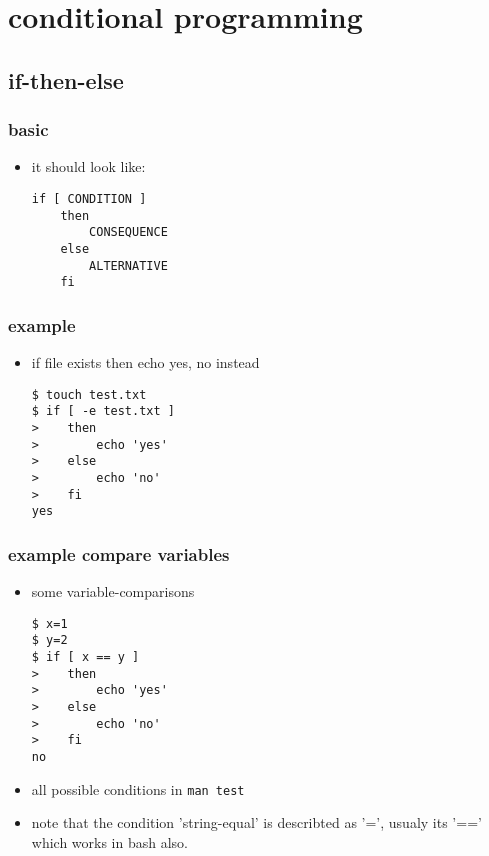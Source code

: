 \documentclass[hyperref={pdfpagelabels=false}]{beamer}
\newcommand{\code}[1]{\colorbox{lGray}{\texttt{#1}}}
\begin{document}
\section{conditional programming}
    \subsection{if-then-else}
		\begin{frame}[fragile]
            \frametitle{basic}
			\begin{itemize}
                \item<1-> it should look like:
                    \begin{verbatim}
if [ CONDITION ]
    then
        CONSEQUENCE
    else
        ALTERNATIVE
    fi
\end{verbatim}
            \end{itemize}
		\end{frame}
		\begin{frame}[fragile]
            \frametitle{example}
			\begin{itemize}
                \item<1-> if file exists then echo yes, no instead
                    \begin{verbatim}
$ touch test.txt
$ if [ -e test.txt ]
>    then
>        echo 'yes'
>    else
>        echo 'no'
>    fi
yes
\end{verbatim}
            \end{itemize}
		\end{frame}
		\begin{frame}[fragile]
            \frametitle{example compare variables}
			\begin{itemize}
                \item<1-> some variable-comparisons
                    \begin{verbatim}
$ x=1
$ y=2
$ if [ x == y ]
>    then
>        echo 'yes'
>    else
>        echo 'no'
>    fi
no
\end{verbatim}
            \item<2-> all possible conditions in \code{man test}
            \item<3-> note that the condition 'string-equal' is describted as '=', usualy its '==' which works in bash also.
            \end{itemize}
		\end{frame}
\end{document}
